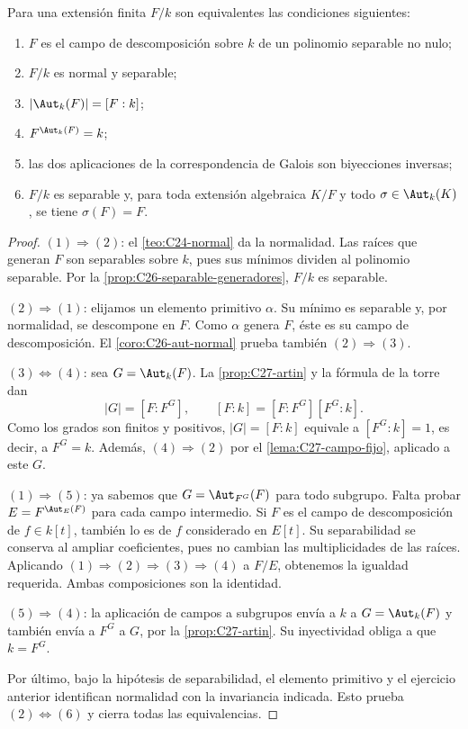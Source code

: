 \begin{teo}\label{teo:C27-galois}
Para una extensión finita $F/k$ son equivalentes las condiciones siguientes:
\begin{enumerate}[label=(\arabic*),nosep]
\item $F$ es el campo de descomposición sobre $k$ de un polinomio separable no nulo;
\item $F/k$ es normal y separable;
\item $|\Aut_k(F)|=[F:k]$;
\item $F^{\Aut_k(F)}=k$;
\item las dos aplicaciones de la correspondencia de Galois son biyecciones inversas;
\item $F/k$ es separable y, para toda extensión algebraica $K/F$ y todo $\sigma\in\Aut_k(K)$, se tiene $\sigma(F)=F$.
\end{enumerate}
\end{teo}
\begin{proof}
$(1)\Rightarrow(2)$: el \cref{teo:C24-normal} da la normalidad. Las raíces que generan $F$ son separables sobre $k$, pues sus mínimos dividen al polinomio separable. Por la \cref{prop:C26-separable-generadores}, $F/k$ es separable.

$(2)\Rightarrow(1)$: elijamos un elemento primitivo $\alpha$. Su mínimo es separable y, por normalidad, se descompone en $F$. Como $\alpha$ genera $F$, éste es su campo de descomposición. El \cref{coro:C26-aut-normal} prueba también $(2)\Rightarrow(3)$.

$(3)\Leftrightarrow(4)$: sea $G=\Aut_k(F)$. La \cref{prop:C27-artin} y la fórmula de la torre dan
\[
|G|=[F:F^G],\qquad [F:k]=[F:F^G][F^G:k].
\]
Como los grados son finitos y positivos, $|G|=[F:k]$ equivale a $[F^G:k]=1$, es decir, a $F^G=k$. Además, $(4)\Rightarrow(2)$ por el \cref{lema:C27-campo-fijo}, aplicado a este $G$.

$(1)\Rightarrow(5)$: ya sabemos que $G=\Aut_{F^G}(F)$ para todo subgrupo. Falta probar $E=F^{\Aut_E(F)}$ para cada campo intermedio. Si $F$ es el campo de descomposición de $f\in k[t]$, también lo es de $f$ considerado en $E[t]$. Su separabilidad se conserva al ampliar coeficientes, pues no cambian las multiplicidades de las raíces. Aplicando $(1)\Rightarrow(2)\Rightarrow(3)\Rightarrow(4)$ a $F/E$, obtenemos la igualdad requerida. Ambas composiciones son la identidad.

$(5)\Rightarrow(4)$: la aplicación de campos a subgrupos envía a $k$ a $G=\Aut_k(F)$ y también envía a $F^G$ a $G$, por la \cref{prop:C27-artin}. Su inyectividad obliga a que $k=F^G$.

Por último, bajo la hipótesis de separabilidad, el elemento primitivo y el ejercicio anterior identifican normalidad con la invariancia indicada. Esto prueba $(2)\Leftrightarrow(6)$ y cierra todas las equivalencias.
\end{proof}


